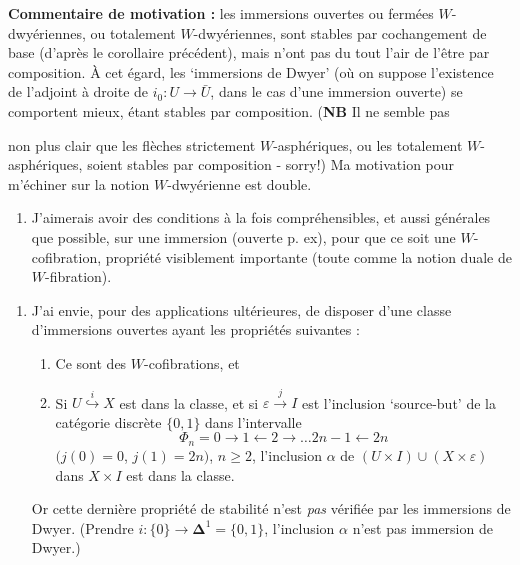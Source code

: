\textbf{Commentaire de motivation :} les immersions ouvertes ou fermées $W$-dwyériennes, ou totalement $W$-dwyériennes, sont stables par cochangement de base (d'après le corollaire précédent), mais n'ont pas du tout l'air de l'être par composition. À cet égard, les `immersions de Dwyer' (où on suppose l'existence de l'adjoint à droite de $i_0:U\longrightarrow\bar{U}$, dans le cas d'une immersion ouverte) se comportent mieux, étant stables par composition. (\textbf{NB} Il ne semble pas


non plus clair que les flèches strictement $W$-asphériques, ou les totalement $W$-asphériques, soient stables par composition - sorry!) Ma motivation pour m'échiner sur la notion $W$-dwyérienne est double.

\begin{enumerate}[label=\alph*)]
\item J'aimerais avoir des conditions à la fois compréhensibles, et aussi générales que possible, sur une immersion (ouverte p. ex), pour que ce soit une $W$-cofibration, propriété visiblement importante (toute comme la notion duale de $W$-fibration). %
\end{enumerate}

\begin{enumerate}
\item[b)] J'ai envie, pour des applications ultérieures, de disposer d'une classe d'immersions ouvertes ayant les propriétés suivantes :
\begin{enumerate}
\item[1°)] Ce sont des $W$-cofibrations, et
\item[2°)] Si $U \overset{i}{\hookrightarrow} X$ est dans la classe, et si $\varepsilon \xrightarrow{j} I$ est l'inclusion ‘source-but’ de la catégorie discrète $\{0,1\}$ dans l'intervalle
\[
\Phi_n = 0 \longrightarrow 1 \longleftarrow 2 \longrightarrow \dots 2n-1 \longleftarrow 2n
\]
$(j(0)=0$, $j(1)=2n)$, $n\geq 2$, l'inclusion $\alpha$ de $(U\times I)\cup(X\times\varepsilon)$ dans $X\times I$ est dans la classe.
\end{enumerate}
Or cette dernière propriété de stabilité n'est \textit{pas} vérifiée par les immersions de Dwyer. (Prendre $i : \{0\} \longrightarrow \boldsymbol{\Delta}^1 = \{0,1\}$, l'inclusion $\alpha$ n'est pas immersion de Dwyer.)
\end{enumerate}

